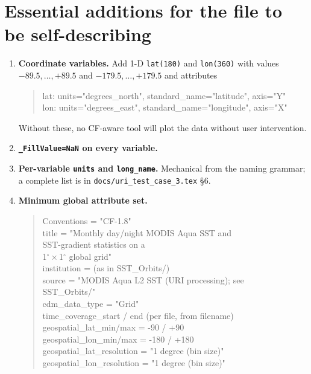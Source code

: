 \documentclass[11pt]{article}
\begin{document}
\section*{Essential additions for the file to be self-describing}

\begin{enumerate}[leftmargin=*,topsep=2pt]
  \item \textbf{Coordinate variables.} Add 1-D
    \texttt{lat(180)} and \texttt{lon(360)} with values
    $-89.5,\ldots,+89.5$ and $-179.5,\ldots,+179.5$ and
    attributes
    \begin{quote}\ttfamily
      lat: units="degrees\_north", standard\_name="latitude",
      axis="Y"\\
      lon: units="degrees\_east",  standard\_name="longitude",
      axis="X"
    \end{quote}
    Without these, no CF-aware tool will plot the data without
    user intervention.
  \item \textbf{\texttt{\_FillValue=NaN} on every variable.}
  \item \textbf{Per-variable \texttt{units} and \texttt{long\_name}.}
    Mechanical from the naming grammar; a complete list is in
    \texttt{docs/uri\_test\_case\_3.tex} \S6.
  \item \textbf{Minimum global attribute set.}
    \begin{quote}\ttfamily
      Conventions = "CF-1.8"\\
      title       = "Monthly day/night MODIS Aqua SST and \\
      \phantom{title       = }SST-gradient statistics on a \\
      \phantom{title       = }1$^\circ\times$1$^\circ$ global grid"\\
      institution = (as in SST\_Orbits/)\\
      source      = "MODIS Aqua L2 SST (URI processing); see \\
      \phantom{source      = }SST\_Orbits/"\\
      cdm\_data\_type = "Grid"\\
      time\_coverage\_start / end (per file, from filename)\\
      geospatial\_lat\_min/max = -90 / +90 \\
      geospatial\_lon\_min/max = -180 / +180\\
      geospatial\_lat\_resolution = "1 degree (bin size)"\\
      geospatial\_lon\_resolution = "1 degree (bin size)"

\end{quote}
\end{enumerate}
\end{document}
